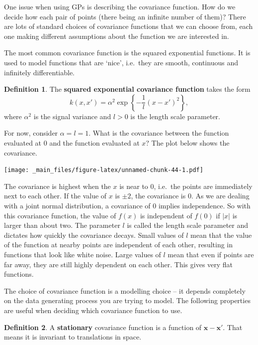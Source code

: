 \documentclass[
]{book}
\theoremstyle{definition}
\newtheorem{definition}{Definition}[chapter]
\theoremstyle{definition}
\theoremstyle{definition}
\theoremstyle{definition}
\theoremstyle{remark}
\begin{document}
One issue when using GPs is describing the covariance function. How do we decide how each pair of points (there being an infinite number of them)? There are lots of standard choices of covariance functions that we can choose from, each one making different assumptions about the function we are interested in.

The most common covariance function is the squared exponential functions. It is used to model functions that are `nice', i.e.~they are smooth, continuous and infinitely differentiable.

\begin{definition}
The \textbf{squared exponential covariance function} takes the form
\[
k(x, x') = \alpha^2\exp\left\{-\frac{1}{l}(x-x')^2\right\},
\]
where \(\alpha^2\) is the signal variance and \(l>0\) is the length scale parameter.
\end{definition}

For now, consider \(\alpha = l = 1\). What is the covariance between the function evaluated at 0 and the function evaluated at \(x\)? The plot below shows the covariance.

\texttt{[image: \_main\_files/figure-latex/unnamed-chunk-44-1.pdf]}

The covariance is highest when the \(x\) is near to 0, i.e.~the points are immediately next to each other. If the value of \(x\) is \(\pm 2\), the covariance is 0. As we are dealing with a joint normal distribution, a covariance of 0 implies independence. So with this covariance function, the value of \(f(x)\) is independent of \(f(0)\) if \(|x|\) is larger than about two. The parameter \(l\) is called the length scale parameter and dictates how quickly the covariance decays. Small values of \(l\) mean that the value of the function at nearby points are independent of each other, resulting in functions that look like white noise. Large values of \(l\) mean that even if points are far away, they are still highly dependent on each other. This gives very flat functions.

The choice of covariance function is a modelling choice -- it depends completely on the data generating process you are trying to model. The following properties are useful when deciding which covariance function to use.

\begin{definition}
A \textbf{stationary} covariance function is a function of \(\boldsymbol{x} - \boldsymbol{x}'\). That means it is invariant to translations in space.
\end{definition}
\end{document}
